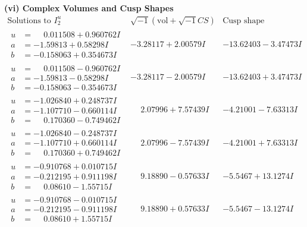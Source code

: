 \documentclass[1p]{elsarticle_modified}
\theoremstyle{definition}
\newcommand{\I}{\sqrt{-1}}
\begin{document}
\newpage\flushleft \textbf{(vi) Complex Volumes and Cusp Shapes}
$$\begin{array}{c|c|c}  
\text{Solutions to }I^u_{2}& \I (\text{vol} + \sqrt{-1}CS) & \text{Cusp shape}\\
 \hline 
\begin{aligned}
u &= \phantom{-}0.011508 + 0.960762 I \\
a &= -1.59813 + 0.58298 I \\
b &= -0.158063 + 0.354673 I\end{aligned}
 & -3.28117 + 2.00579 I & -13.62403 - 3.47473 I \\ \hline\begin{aligned}
u &= \phantom{-}0.011508 - 0.960762 I \\
a &= -1.59813 - 0.58298 I \\
b &= -0.158063 - 0.354673 I\end{aligned}
 & -3.28117 - 2.00579 I & -13.62403 + 3.47473 I \\ \hline\begin{aligned}
u &= -1.026840 + 0.248737 I \\
a &= -1.107710 - 0.660114 I \\
b &= \phantom{-}0.170360 - 0.749462 I\end{aligned}
 & \phantom{-}2.07996 + 7.57439 I & -4.21001 - 7.63313 I \\ \hline\begin{aligned}
u &= -1.026840 - 0.248737 I \\
a &= -1.107710 + 0.660114 I \\
b &= \phantom{-}0.170360 + 0.749462 I\end{aligned}
 & \phantom{-}2.07996 - 7.57439 I & -4.21001 + 7.63313 I \\ \hline\begin{aligned}
u &= -0.910768 + 0.010715 I \\
a &= -0.212195 + 0.911198 I \\
b &= \phantom{-}0.08610 - 1.55715 I\end{aligned}
 & \phantom{-}9.18890 - 0.57633 I & -5.5467 + 13.1274 I \\ \hline\begin{aligned}
u &= -0.910768 - 0.010715 I \\
a &= -0.212195 - 0.911198 I \\
b &= \phantom{-}0.08610 + 1.55715 I\end{aligned}
 & \phantom{-}9.18890 + 0.57633 I & -5.5467 - 13.1274 I \\ \hline\begin{aligned}

\end{aligned}
\end{array}$$
\end{document}
